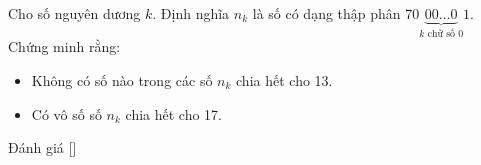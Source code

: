 \ifshowproblem
\begin{problem}\label{problem:GER-2015-MO-P4}
	Cho số nguyên dương \( k \). Định nghĩa \( n_k \) là số có dạng thập phân \( 70\underbrace{00\ldots0}_{k \text{ chữ số } 0}1 \).
	Chứng minh rằng:
    \begin{itemize}[topsep=0pt, partopsep=0pt, itemsep=0pt]
        \item Không có số nào trong các số \( n_k \) chia hết cho 13.
        \item Có vô số số \( n_k \) chia hết cho 17.
    \end{itemize}
\end{problem}
\fi

\ifshowinfo
Đánh giá [\textbf{}]\footnotemark
{}
\fi